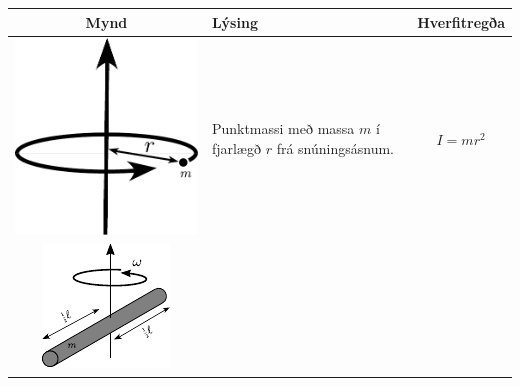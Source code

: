 \begin{table}[h!]
  \centering
  \begin{tabular}{ | c | m{5cm} | m{5cm} | }
    \hline
    Mynd & Lýsing & Hverfitregða \\ \hline
    \begin{minipage}{.3\textwidth}
    \vspace{0.3cm}
    \centering
      \includegraphics[width=0.7\linewidth]{momentsOfInertia/PointInertia.pdf}
    \vspace{0.3cm}
    \end{minipage}
    &
      Punktmassi með massa $m$ í fjarlægð $r$ frá snúningsásnum.
    & 
      \begin{align*}
          I = mr^2
      \end{align*}
    \\ \hline
        \begin{minipage}{.3\textwidth}
        \vspace{0.3cm}
    \centering
      \includegraphics[width=0.8\linewidth]{momentsOfInertia/Moment_of_inertia_rod_center.pdf}

\end{minipage}
\end{tabular}
\end{table}
